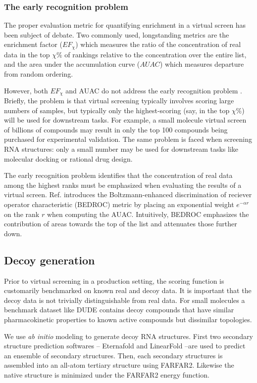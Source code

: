 \documentclass[%
 aip,
 amsmath,amssymb,
 reprint,%
]{revtex4-1}
\begin{document}
\subsubsection{The early recognition problem}

The proper evaluation metric for quantifying enrichment in a virtual screen has been subject of debate. Two commonly used, longstanding metrics are the enrichment factor ($EF_\chi$) which measures the ratio of the concentration of real data in the top $\chi\%$ of rankings relative to the concentration over the entire list, and the area under the accumulation curve ($AUAC$) which measures departure from random ordering.

However, both $EF_\chi$ and AUAC do not address the early recognition problem \cite{truncheon}. Briefly, the problem is that virtual screening typically involves scoring large numbers of samples, but typically only the highest-scoring (say, in the top $\chi\%$) will be used for downstream tasks. For example, a small molecule virtual screen of billions of compounds may result in only the top 100 compounds being purchased for experimental validation. The same problem is faced when screening RNA structures: only a small number may be used for downstream tasks like molecular docking or rational drug design.

The early recognition problem identifies that the concentration of real data among the highest ranks must be emphasized when evaluating the results of a virtual screen. Ref.\cite{truncheon} introduces the Boltzmann-enhanced discrimination of reciever operator characteristic (BEDROC) metric by placing an exponential weight $e^{-\alpha r}$ on the rank $r$ when computing the AUAC. Intuitively, BEDROC emphasizes the contribution of areas towards the top of the list and attenuates those further down.

\subsection{Decoy generation}

Prior to virtual screening in a production setting, the scoring function is customarily benchmarked on known real and decoy data. It is important that the decoy data is not trivially distinguishable from real data. For small molecules a benchmark dataset like DUDE contains decoy compounds that have similar pharmacokinetic properties to known active compounds but dissimilar topologies\cite{dude}.

We use {\it ab initio} modeling to generate decoy RNA structures. First two secondary structure prediction softwares -- Eternafold and LinearFold --are used to predict an ensemble of secondary structures. Then, each secondary structures is assembled into an all-atom tertiary structure using FARFAR2. Likewise the native structure is minimized under the FARFAR2 energy function.
\end{document}
